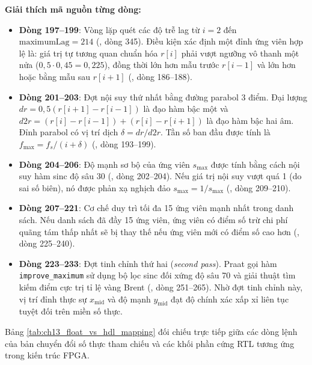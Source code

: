 \textbf{Giải thích mã nguồn từng dòng:}
\begin{itemize}
    \item \textbf{Dòng 197--199}: Vòng lặp quét các độ trễ lag từ $i = 2$ đến $\text{maximumLag} = 214$ (, dòng 345). Điều kiện xác định một đỉnh ứng viên hợp lệ là: giá trị tự tương quan chuẩn hóa $r[i]$ phải vượt ngưỡng vô thanh một nửa ($0{,}5 \cdot 0{,}45 = 0{,}225$), đồng thời lớn hơn mẫu trước $r[i-1]$ và lớn hơn hoặc bằng mẫu sau $r[i+1]$ (, dòng 186--188).
    \item \textbf{Dòng 201--203}: Đợt nội suy thứ nhất bằng đường parabol 3 điểm. Đại lượng $dr = 0{,}5(r[i+1] - r[i-1])$ là đạo hàm bậc một và $d2r = (r[i] - r[i-1]) + (r[i] - r[i+1])$ là đạo hàm bậc hai âm. Đỉnh parabol có vị trí dịch $\delta = dr / d2r$. Tần số ban đầu được tính là $f_{\max} = f_s / (i + \delta)$ (, dòng 193--199).
    \item \textbf{Dòng 204--206}: Độ mạnh sơ bộ của ứng viên $s_{\max}$ được tính bằng cách nội suy hàm sinc độ sâu 30 (, dòng 202--204). Nếu giá trị nội suy vượt quá 1 (do sai số biên), nó được phản xạ nghịch đảo $s_{\max} = 1 / s_{\max}$ (, dòng 209--210).
    \item \textbf{Dòng 207--221}: Cơ chế duy trì tối đa 15 ứng viên mạnh nhất trong danh sách. Nếu danh sách đã đầy 15 ứng viên, ứng viên có điểm số trừ chi phí quãng tám thấp nhất sẽ bị thay thế nếu ứng viên mới có điểm số cao hơn (, dòng 225--240).
    \item \textbf{Dòng 223--233}: Đợt tinh chỉnh thứ hai (\emph{second pass}). Praat gọi hàm \texttt{improve\_maximum} sử dụng bộ lọc sinc đối xứng độ sâu 70 và giải thuật tìm kiếm điểm cực trị tỉ lệ vàng Brent (, dòng 251--265). Nhờ đợt tinh chỉnh này, vị trí đỉnh thực sự $x_{\text{mid}}$ và độ mạnh $y_{\text{mid}}$ đạt độ chính xác xấp xỉ liên tục tuyệt đối trên miền số thực.
\end{itemize}

Bảng \ref{tab:ch13_float_vs_hdl_mapping} đối chiếu trực tiếp giữa các dòng lệnh của bản chuyển đổi số thực tham chiếu và các khối phần cứng RTL tương ứng trong kiến trúc FPGA.

